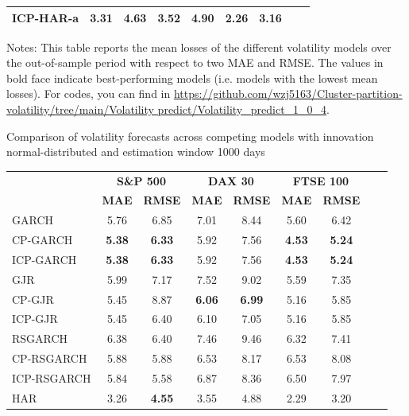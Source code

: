 \documentclass[preprint,12pt,authoryear]{elsarticle}
\begin{document}
\begin{center}
\begin{threeparttable}
\begin{tabular}{l c c c c c c c c}
ICP-HAR-a    & 3.31          & 4.63          & 3.52 & 4.90          & \textbf{2.26} & 3.16 \\
\bottomrule
\end{tabular}
Notes: This table reports the mean losses of the different volatility models over the out-of-sample period with respect to two MAE and RMSE. The values in bold face indicate best-performing models (i.e. models with the lowest mean losses). For codes, you can find in
\url{https://github.com/wzj5163/Cluster-partition-volatility/tree/main/Volatility predict/Volatility_predict_1_0_4}.
\end{threeparttable}
\end{center}

\begin{center}
\begin{threeparttable}
\centering \footnotesize
\caption{\footnotesize Comparison of volatility forecasts across competing models with innovation normal-distributed and estimation window 1000 days}\label{tab34_3_1}
\begin{tabular}{l c c c c c c c c}
\toprule
 & \multicolumn{2}{c}{\textbf{S\&P 500}} & \multicolumn{2}{c}{\textbf{DAX 30}} & \multicolumn{2}{c}{\textbf{FTSE 100}} \\
\cmidrule(r){2-3} \cmidrule(r){4-5} \cmidrule(r){6-7}
 & \textbf{MAE} & \textbf{RMSE} & \textbf{MAE} & \textbf{RMSE} & \textbf{MAE} & \textbf{RMSE} \\
\cmidrule{2-7}
GARCH        &  5.76  &   6.85  &   7.01  &  8.44  &   5.60  &   6.42  \\
CP-GARCH     & \textbf{5.38} & \textbf{6.33} & 5.92 & 7.56 & \textbf{4.53} & \textbf{5.24} \\
ICP-GARCH    & \textbf{5.38} & \textbf{6.33} & 5.92 & 7.56 & \textbf{4.53} & \textbf{5.24} \\
GJR          &  5.99  &   7.17  &   7.52  &  9.02  &   5.59  &   7.35  \\
CP-GJR       &  5.45  &   8.87  & \textbf{6.06} & \textbf{6.99} & 5.16 & 5.85 \\
ICP-GJR      &  5.45  &   6.40  &   6.10  &  7.05  & 5.16 & 5.85 \\
RSGARCH      &  6.38  &   6.40  &   7.46  &  9.46  &   6.32  &   7.41  \\
CP-RSGARCH   &  5.88  &   5.88  &   6.53  &  8.17  &   6.53  &   8.08  \\
ICP-RSGARCH  &  5.84  &   5.58  &   6.87  &  8.36  &   6.50  &   7.97  \\
\midrule
HAR          &  3.26  & \textbf{4.55} & 3.55 & 4.88 & 2.29 & 3.20 \\

\end{tabular}
\end{threeparttable}
\end{center}
\end{document}
